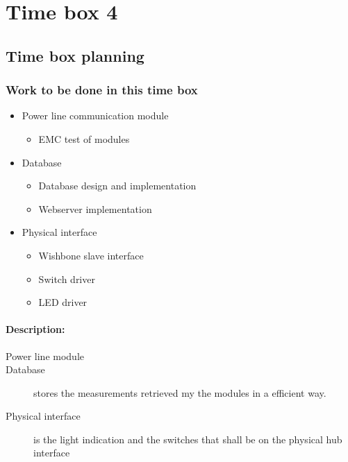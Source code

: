 \section{Time box 4}
\listoftodos
\subsection{Time box planning}
\begin{figure}[H]
	\begin{centering}
	\end{centering}
\end{figure}
\subsubsection{Work to be done in this time box}
\begin{itemize}
	\item Power line communication module
	\begin{itemize}
		\item EMC test of modules
	\end{itemize}
	\item Database
	\begin{itemize}
		\item	Database design and implementation
		\item	Webserver implementation
	\end{itemize}
	\item Physical interface
	\begin{itemize}
		\item Wishbone slave interface
		\item Switch driver
		\item LED driver
	\end{itemize}
\end{itemize}
\paragraph{Description:}
\begin{description}
	\item[Power line module] 
	\item[Database] stores the measurements retrieved my the modules in a efficient way.
	\item[Physical interface] is the light indication and the switches that shall be on the physical hub interface
\end{description}
